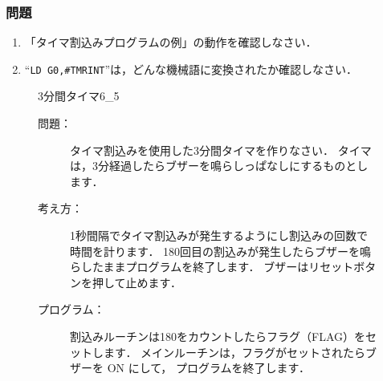 \vfill
\subsubsection{問題}
\begin{enumerate}
\item 「タイマ割込みプログラムの例」の動作を確認しなさい．
\item ``{\tt LD G0,\#TMRINT}''は，どんな機械語に変換されたか確認しなさい．
\end{enumerate}
\vfill

\begin{figure}[btp]
\begin{reidai}{3分間タイマ}{6_5}
\begin{description}
\item[問題：] タイマ割込みを使用した3分間タイマを作りなさい．
タイマは，3分経過したらブザーを鳴らしっぱなしにするものとします．

\item[考え方：]
1秒間隔でタイマ割込みが発生するようにし割込みの回数で時間を計ります．
180回目の割込みが発生したらブザーを鳴らしたままプログラムを終了します．
ブザーはリセットボタンを押して止めます．

\item[プログラム：]
割込みルーチンは180をカウントしたらフラグ（FLAG）をセットします．
メインルーチンは，フラグがセットされたらブザーを ON にして，
プログラムを終了します．


\end{description}
\end{reidai}
\end{figure}
